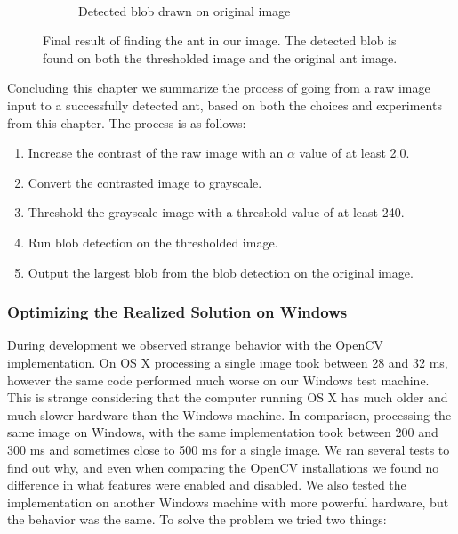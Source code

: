 \begin{figure}
\begin{subfigure}[b]{0.45\textwidth}
                \caption{\mbox{}\\Detected blob drawn on original image}
        \end{subfigure}
		\caption{Final result of finding the ant in our image. The detected blob is found on both the thresholded image and the original ant image.}
		\label{fig:finalResult}
\end{figure}

Concluding this chapter we summarize the process of going from a raw image input to a successfully detected ant, based on both the choices and experiments from this chapter. The process is as follows:

\begin{enumerate}
    \item Increase the contrast of the raw image with an $\alpha$ value of at least 2.0.
    \item Convert the contrasted image to grayscale.
    \item Threshold the grayscale image with a threshold value of at least 240.
    \item Run blob detection on the thresholded image.
    \item Output the largest blob from the blob detection on the original image.
\end{enumerate}

\subsubsection{Optimizing the Realized Solution on Windows} \mbox{}\par
\label{sec:optimizing}
During development we observed strange behavior with the OpenCV implementation. On OS X processing a single image took between 28 and 32 ms, however the same code performed much worse on our Windows test machine. This is strange considering that the computer running OS X has much older and much slower hardware than the Windows machine. In comparison, processing the same image on Windows, with the same implementation took between 200 and 300 ms and sometimes close to 500 ms for a single image. We ran several tests to find out why, and even when comparing the OpenCV installations we found no difference in what features were enabled and disabled. We also tested the implementation on another Windows machine with more powerful hardware, but the behavior was the same. To solve the problem we tried two things:\\


